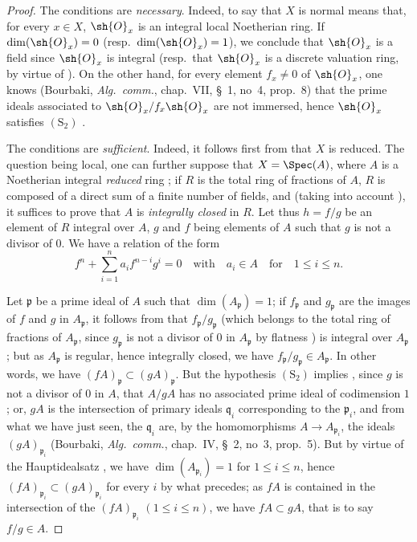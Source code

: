 \begin{proof}
The conditions are \emph{necessary}.
Indeed, to say that $X$ is normal means that, for every $x\in X$, $\sh{O}_x$ is an integral local Noetherian ring.
If $\dim(\sh{O}_x)=0$ (resp.\ $\dim(\sh{O}_x)=1$), we conclude that $\sh{O}_x$ is a field since $\sh{O}_x$ is integral (resp.\ that $\sh{O}_x$ is a discrete valuation ring, by virtue of ).
On the other hand, for every element $f_x\neq 0$ of $\sh{O}_x$, one knows (Bourbaki, \emph{Alg.\ comm.}, chap.~VII, \S~1, no~4, prop.~8) that the prime ideals associated to $\sh{O}_x/f_x\sh{O}_x$ are not immersed, hence $\sh{O}_x$ satisfies $(\mathrm{S}_2)$ .

The conditions are \emph{sufficient}.
Indeed, it follows first from  that $X$ is reduced.
The question being local, one can further suppose that $X=\Spec(A)$, where $A$ is a Noetherian integral \emph{reduced} ring ; if $R$ is the total ring of fractions of $A$, $R$ is composed of a direct sum of a finite number of fields, and (taking into account ), it suffices to prove that $A$ is \emph{integrally closed} in $R$.
Let thus $h=f/g$ be an element of $R$ integral over $A$, $g$ and $f$ being elements of $A$ such that $g$ is not a divisor of $0$.
We have a relation of the form
\begin{equation}
\label{IV.5.8.6.1}
f^n+\sum_{i=1}^{n} a_i f^{n-i} g^i = 0 \quad\text{with}\quad a_i\in A \quad\text{for}\quad 1\leqslant i\leqslant n. \tag{5.8.6.1}
\end{equation}

Let $\mathfrak{p}$ be a prime ideal of $A$ such that $\dim(A_\mathfrak{p})=1$; if $f_\mathfrak{p}$ and $g_\mathfrak{p}$ are the images of $f$ and $g$ in $A_\mathfrak{p}$, it follows from  that $f_\mathfrak{p}/g_\mathfrak{p}$ (which belongs to the total ring of fractions of $A_\mathfrak{p}$, since $g_\mathfrak{p}$ is not a divisor of $0$ in $A_\mathfrak{p}$ by flatness ) is integral over $A_\mathfrak{p}$; but as $A_\mathfrak{p}$ is regular, hence integrally closed, we have $f_\mathfrak{p}/g_\mathfrak{p}\in A_\mathfrak{p}$.
In other words, we have $(fA)_\mathfrak{p}\subset(gA)_\mathfrak{p}$.
But the hypothesis $(\mathrm{S}_2)$ implies , since $g$ is not a divisor of $0$ in $A$, that $A/gA$ has no associated prime ideal of codimension $1$; or, $gA$ is the intersection of primary ideals $\mathfrak{q}_i$ corresponding to the $\mathfrak{p}_i$, and from what we have just seen, the $\mathfrak{q}_i$ are, by the homomorphisms $A\to A_{\mathfrak{p}_i}$, the ideals $(gA)_{\mathfrak{p}_i}$ (Bourbaki, \emph{Alg.\ comm.}, chap.~IV, \S~2, no~3, prop.~5).
But by virtue of the Hauptidealsatz , we have $\dim(A_{\mathfrak{p}_i})=1$ for $1\leqslant i\leqslant n$, hence $(fA)_{\mathfrak{p}_i}\subset(gA)_{\mathfrak{p}_i}$ for every $i$ by what precedes; as $fA$ is contained in the intersection of the $(fA)_{\mathfrak{p}_i}$ $(1\leqslant i\leqslant n)$, we have $fA\subset gA$, that is to say $f/g\in A$.
\end{proof}

